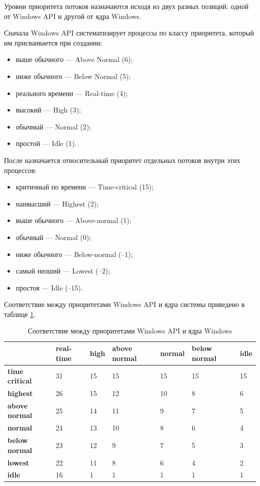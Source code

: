 \documentclass[a4paper,14pt,russian]{extreport}
\begin{document}
	Уровни приоритета потоков назначаются исходя из двух разных позиций:
	одной от Windows API и другой от ядра Windows.
	
	Сначала Windows API систематизирует процессы по классу приоритета, который им присваивается при создании:
	\begin{itemize}
		\item выше обычного — Above Normal (6);
		\item ниже обычного — Below Normal (5);
		\item реального времени — Real-time (4);
		\item высокий — High (3);
		\item обычный — Normal (2);
		\item простой — Idle (1).
	\end{itemize}

	После назначается относительный приоритет отдельных потоков внутри этих процессов:
	\begin{itemize}
		\item критичный по времени — Time-critical (15);
		\item наивысший — Highest (2);
		\item выше обычного — Above-normal (1);
		\item обычный — Normal (0);
		\item ниже обычного — Below-normal (–1);
		\item самый низший — Lowest (–2);
		\item простоя — Idle (–15).
	\end{itemize}

	Соответствие между приоритетами Windows API и ядра системы приведено в таблице \ref{tbl:priority}.
	
	\begin{table}[h]
		\caption{Соответствие между приоритетами Windows API и ядра Windows}
		\begin{center}
			\begin{tabular}{|l|p{45pt}|p{45pt}|p{45pt}|p{45pt}|p{45pt}|p{45pt}|}
				\hline
				{} & \textbf{real-time} & \textbf{high} & \textbf{above normal} & \textbf{normal} & \textbf{below normal} & \textbf{idle}\\
				\hline
				\textbf{time critical} & 31 & 15 & 15 & 15 & 15 & 15 \\
				\hline
				\textbf{highest} & 26 & 15 & 12 & 10 & 8 & 6 \\
				\hline
				\textbf{above normal} & 25 & 14 & 11 & 9 & 7 & 5 \\
				\hline
				\textbf{normal} & 24 & 13 & 10 & 8 & 6 & 4 \\
				\hline
				\textbf{below normal} & 23 & 12 & 9 & 7 & 5 & 3 \\
				\hline
				\textbf{lowest} & 22 & 11 & 8 & 6 & 4 & 2 \\
				\hline
				\textbf{idle} & 16 & 1 & 1 & 1 & 1 & 1 \\
				\hline
			\end{tabular}
		\end{center}
		\label{tbl:priority}
	\end{table}
\end{document}
